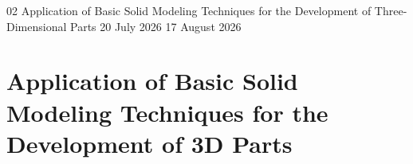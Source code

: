 \begin{refsection}

  \GenerateCoverPage
  {02} %
  {Application of Basic Solid Modeling Techniques for the Development of Three-Dimensional
    Parts} %
  {20 July 2026} %
  {17 August 2026} %

  \noindent

  \chapter{Application of Basic Solid Modeling Techniques for the Development of 3D Parts}

  
  
  
  
  
  
  
  
  
  
  
  
  

\end{refsection}

\setcounter{section}{0}
